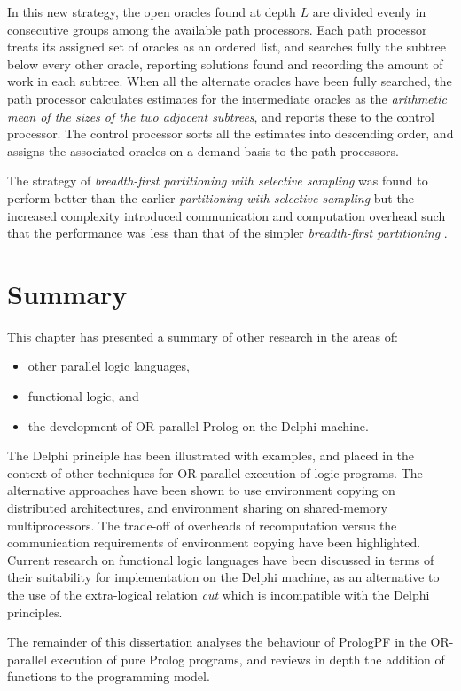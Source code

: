 \begin{itemize}
{  In this new strategy, the open oracles found at depth $L$ are divided evenly
  in consecutive groups among the available path processors.  Each path processor
  treats its assigned set of oracles as an ordered list, and searches fully the
  subtree below every other oracle, reporting solutions found and recording the amount
  of work in each subtree.  When all the alternate oracles have been fully searched,
  the path processor calculates estimates for the intermediate oracles as the
  \textit{arithmetic mean of the sizes of the two adjacent subtrees}, and reports these
  to the control processor.  The control processor sorts all the estimates into
  descending order, and assigns the associated oracles on a demand basis to
  the path processors.

  The strategy of \textit{breadth-first partitioning with selective sampling} was found
  to perform better than the earlier \textit{partitioning with selective sampling}
  but the increased complexity introduced communication and computation overhead such that
  the performance was less than that of the simpler \textit{breadth-first partitioning}
  \cite{Sar95}.
  }
\end{itemize}

\section{Summary} %

This chapter has presented a summary of other research in the areas of:
\begin{itemize}
\item{other parallel logic languages,}
\item{functional logic, and}
\item{the development of OR-parallel Prolog on the Delphi machine.}
\end{itemize}

The Delphi principle has been illustrated with examples, and placed in the
context of other techniques for OR-parallel execution of logic programs.
The alternative approaches have been shown to use environment copying on
distributed architectures, and environment sharing on shared-memory
multiprocessors.
The trade-off of overheads of recomputation versus the communication requirements of
environment copying have been highlighted.  Current research on functional logic languages
have been discussed in terms of their suitability for implementation on the Delphi
machine, as an alternative to the use of the extra-logical relation \textit{cut} which is
incompatible with the Delphi principles.

The remainder of this dissertation analyses the behaviour of PrologPF in the OR-parallel
execution of pure Prolog programs, and reviews in depth the addition of functions
to the programming model.










